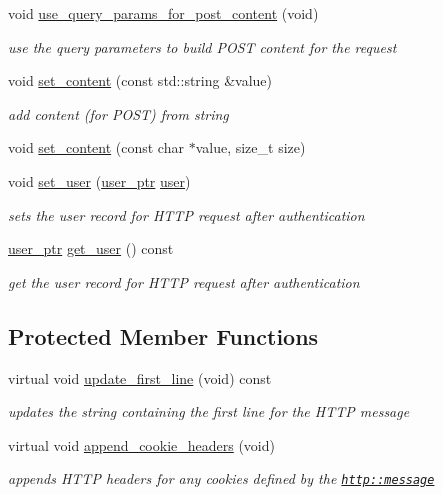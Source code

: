 \begin{DoxyCompactItemize}
void \hyperlink{classpion_1_1http_1_1request_abb1410c7dbbdc3a18997ee2486585106}{use\-\_\-query\-\_\-params\-\_\-for\-\_\-post\-\_\-content} (void)
\begin{DoxyCompactList}\small\item\em use the query parameters to build P\-O\-S\-T content for the request \end{DoxyCompactList}\item 
void \hyperlink{classpion_1_1http_1_1request_a343d9892b3a658acd3a28eadb908748d}{set\-\_\-content} (const std\-::string \&value)
\begin{DoxyCompactList}\small\item\em add content (for P\-O\-S\-T) from string \end{DoxyCompactList}\item 
void \hyperlink{classpion_1_1http_1_1request_aa3df02baf7762c38c2dbbf04a02526fd}{set\-\_\-content} (const char $\ast$value, size\-\_\-t size)
\item 
void \hyperlink{classpion_1_1http_1_1request_abe13dc66982da6ab6cc08ff68710d4af}{set\-\_\-user} (\hyperlink{namespacepion_afd2ae32f926db1286ba2e83011456e11}{user\-\_\-ptr} \hyperlink{classpion_1_1user}{user})
\begin{DoxyCompactList}\small\item\em sets the user record for H\-T\-T\-P request after authentication \end{DoxyCompactList}\item 
\hyperlink{namespacepion_afd2ae32f926db1286ba2e83011456e11}{user\-\_\-ptr} \hyperlink{classpion_1_1http_1_1request_a0c525f2d99bad69e67353cb2478c6b74}{get\-\_\-user} () const 
\begin{DoxyCompactList}\small\item\em get the user record for H\-T\-T\-P request after authentication \end{DoxyCompactList}\end{DoxyCompactItemize}
\subsection*{Protected Member Functions}
\begin{DoxyCompactItemize}
\item 
virtual void \hyperlink{classpion_1_1http_1_1request_a48f4d55f5be5e6bed2936ad8efa8b8ff}{update\-\_\-first\-\_\-line} (void) const 
\begin{DoxyCompactList}\small\item\em updates the string containing the first line for the H\-T\-T\-P message \end{DoxyCompactList}\item 
virtual void \hyperlink{classpion_1_1http_1_1request_a17fbce903b00388346ad85e8b3d997b3}{append\-\_\-cookie\-\_\-headers} (void)
\begin{DoxyCompactList}\small\item\em appends H\-T\-T\-P headers for any cookies defined by the \href{http::message}{\tt http\-::message} \end{DoxyCompactList}\end{DoxyCompactItemize}
